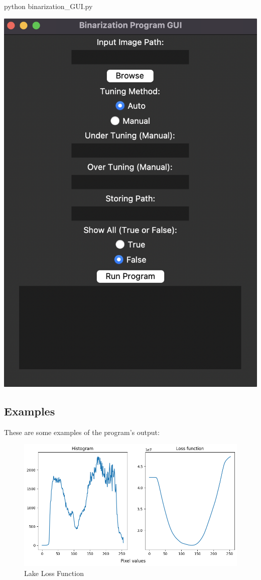 \begin{bashscript}
    python binarization\_GUI.py
\end{bashscript}

\includegraphics[scale=0.6]{../Images/examples/GUI.png}

\subsection{Examples}

These are some examples of the program's output:

\begin{figure}[H]
    \centering
    \includegraphics[width=0.6\columnwidth]{../Images/examples/lake_loss.png}
    \caption{Lake Loss Function}
    \label{fig-1}
\end{figure}



